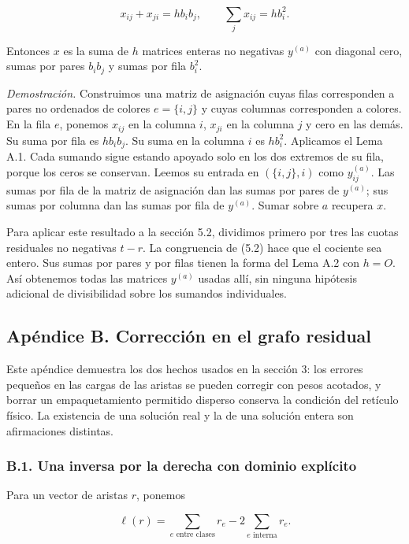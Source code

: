 \documentclass[spanish,11pt,a4paper]{article}
\begin{document}
\[x_{ij}+x_{ji}=h b_ib_j,\qquad \sum_j x_{ij}=h b_i^2.\]

Entonces \(x\) es la suma de \(h\) matrices enteras no negativas \(y^{(a)}\) con diagonal cero, sumas por pares \(b_ib_j\) y sumas por fila \(b_i^2\).

\emph{Demostración.} Construimos una matriz de asignación cuyas filas corresponden a pares no ordenados de colores \(e=\{i,j\}\) y cuyas columnas corresponden a colores. En la fila \(e\), ponemos \(x_{ij}\) en la columna \(i\), \(x_{ji}\) en la columna \(j\) y cero en las demás. Su suma por fila es \(h b_ib_j\). Su suma en la columna \(i\) es \(h b_i^2\). Aplicamos el Lema A.1. Cada sumando sigue estando apoyado solo en los dos extremos de su fila, porque los ceros se conservan. Leemos su entrada en \((\{i,j\},i)\) como \(y^{(a)}_{ij}\). Las sumas por fila de la matriz de asignación dan las sumas por pares de \(y^{(a)}\); sus sumas por columna dan las sumas por fila de \(y^{(a)}\). Sumar sobre \(a\) recupera \(x\).

Para aplicar este resultado a la sección 5.2, dividimos primero por tres las cuotas residuales no negativas \(t-r\). La congruencia de (5.2) hace que el cociente sea entero. Sus sumas por pares y por filas tienen la forma del Lema A.2 con \(h=O\). Así obtenemos todas las matrices \(y^{(a)}\) usadas allí, sin ninguna hipótesis adicional de divisibilidad sobre los sumandos individuales.

\subsection{Apéndice B. Corrección en el grafo residual}\label{apuxe9ndice-b.-correcciuxf3n-en-el-grafo-residual}

Este apéndice demuestra los dos hechos usados en la sección 3: los errores pequeños en las cargas de las aristas se pueden corregir con pesos acotados, y borrar un empaquetamiento permitido disperso conserva la condición del retículo físico. La existencia de una solución real y la de una solución entera son afirmaciones distintas.

\subsubsection{B.1. Una inversa por la derecha con dominio explícito}\label{b.1.-una-inversa-por-la-derecha-con-dominio-expluxedcito}

Para un vector de aristas \(r\), ponemos

\[\ell(r)=\sum_{e\text{ entre clases}}r_e-2\sum_{e\text{ interna}}r_e.\]
\end{document}
